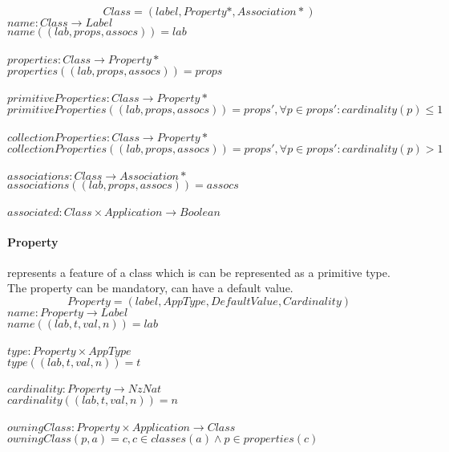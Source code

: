 \documentclass[11pt]{article}
\begin{document}
$$Class = (label, Property*, Association*)$$
$name : Class \rightarrow Label$ \\
$name((lab, props, assocs)) = lab$ \\ \\
$properties : Class \rightarrow Property*$ \\
$properties((lab, props, assocs)) = props $\\ \\
$primitiveProperties : Class \rightarrow Property*$ \\
$primitiveProperties((lab, props, assocs)) = props', \forall p \in props' : cardinality(p) \leq 1 $\\ \\
$collectionProperties : Class \rightarrow Property*$ \\
$collectionProperties((lab, props, assocs)) = props', \forall p \in props' : cardinality(p) > 1 $\\ \\
$associations : Class \rightarrow Association*$ \\
$associations((lab, props, assocs)) = assocs $ \\ \\
$associated :  Class \times Application \rightarrow Boolean $

\paragraph{Property} represents a feature of  a class which is can be represented as a primitive type. The property can be mandatory, can have a default value.
$$
Property = (label, AppType, DefaultValue, Cardinality)
$$
$name : Property \rightarrow Label$ \\
$name((lab, t, val, n)) = lab$ \\ \\
$type : Property \times AppType$ \\
$type((lab, t, val, n)) = t$ \\ \\
$cardinality : Property \rightarrow NzNat$ \\
$cardinality((lab, t, val, n)) = n$ \\ \\
$owningClass : Property \times Application \rightarrow Class $ \\
$owningClass(p, a) = c, c \in classes(a) \wedge p \in properties(c) $
\end{document}
